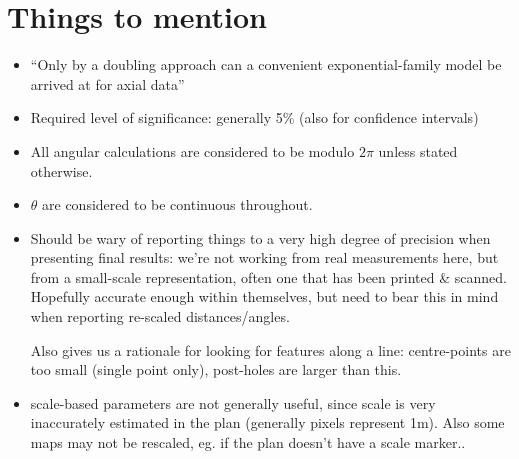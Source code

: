 \documentclass[10pt,fleqn]{article}
\begin{document}
\section*{Things to mention}
\begin{itemize}

\item 
``Only by a doubling approach can a convenient exponential-family model be arrived at for axial data'' \cite{Arnold2011}

\item
Required level of significance: generally 5\% (also for confidence intervals)

\item
All angular calculations are considered to be modulo $2\pi$ unless stated otherwise.

\item
$\theta$ are considered to be continuous throughout.

\item
Should be wary of reporting things to a very high degree of precision when presenting final results: we're not working from real measurements here, but from a small-scale representation, often one that has been printed \& scanned. Hopefully accurate enough within themselves, but need to bear this in mind when reporting re-scaled distances/angles.

Also gives us a rationale for looking for features along a line: centre-points are too small (single point only), post-holes are larger than this.

\item
scale-based parameters are not generally useful, since scale is very inaccurately estimated in the plan (generally  pixels represent 1m). Also some maps may not be rescaled, eg. if the plan doesn't have a scale marker..

\end{itemize}
\newpage



\newpage
\tableofcontents


\newpage


\newpage


\newpage


\newpage


\newpage


\newpage


\newpage


\newpage


\newpage


\newpage




\newpage
\printbibliography
\end{document}
